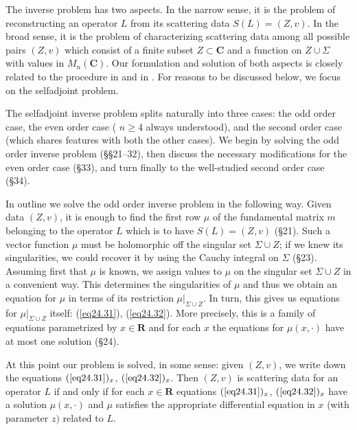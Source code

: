 \documentclass{surv-l}
\theoremstyle{plain}
\theoremstyle{definition}
\numberwithin{equation}{chapter}
\begin{document}
The inverse problem has two aspects. In the narrow sense, it is the problem of reconstructing an operator $L$ from its scattering data $S(L)=(Z, v)$. In the broad sense, it is the problem of characterizing scattering data among all possible pairs $(Z, v)$ which consist of a finite subset $Z\subset \mathbf{C}$ and a function on $ Z\cup\Sigma$ with values in $M_{n}(\mathbf{C})$. Our formulation and solution of both aspects is closely related to the procedure in \cite{BC1} and in \cite{Be}. For reasons to be discussed below, we focus on the selfadjoint problem.

The selfadjoint inverse problem splits naturally into three cases: the odd order case, the even order case ( $n\geq 4$ always understood), and the second order case (which shares features with both the other cases). We begin by solving the odd order inverse problem (\S\S 21--32), then discuss the necessary modifications for the even order case (\S 33), and turn finally to the well-studied second order case (\S 34).

In outline we solve the odd order inverse problem in the following way. Given data $(Z, v)$, it is enough to find the first row $\mu$ of the fundamental matrix $m$ belonging to the operator $L$ which is to have $S(L)=(Z, v)$ (\S 21). Such a vector function $\mu$ must be holomorphic off the singular set $\Sigma\cup Z$; if we knew its singularities, we could recover it by using the Cauchy integral on $\Sigma$ (\S 23). Assuming first that $\mu$ is known, we assign values to $\mu$ on the singular set $\Sigma\cup Z$ in a convenient way. This determines the singularities of $\mu$ and thus we obtain an equation for $\mu$ in terms of its restriction $\mu|_{\Sigma{\cup} Z}$. In turn, this gives us equations for $\mu|_{\Sigma{\cup} Z}$ itself: (\ref{eq24.31}), (\ref{eq24.32}). More precisely, this is a family of equations parametrized by $x\in \mathbf{R}$ and for each $x$ the equations for $\mu(x,\cdot)$ have at most one solution (\S 24).

At this point our problem is solved, in some sense: given $(Z, v)$, we write down the equations $(\text{\ref{eq24.31}})_{x}$, $(\text{\ref{eq24.32}})_{x}$. Then $(Z, v)$ is scattering data for an operator $L$ if and only if for each $x\in \mathbf{R}$ equations $(\text{\ref{eq24.31}})_{x}$, $(\text{\ref{eq24.32}})_{x}$ have a solution $\mu(x, \cdot)$ and $\mu$ satisfies the appropriate differential equation in $x$ (with parameter $z)$ related to $L$.
\end{document}
